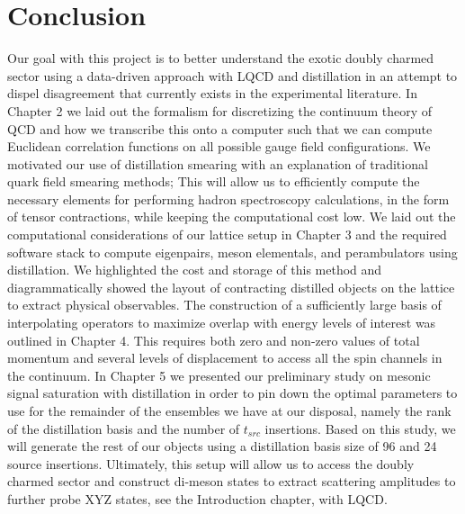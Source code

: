 \section{Conclusion}
Our goal with this project is to better understand the exotic doubly charmed sector using a data-driven approach with LQCD and distillation in an attempt to dispel disagreement that currently exists in the experimental literature. In Chapter 2 we laid out the formalism for discretizing the continuum theory of QCD and how we transcribe this onto a computer such that we can compute Euclidean correlation functions on all possible gauge field configurations. We motivated our use of distillation smearing with an explanation of traditional quark field smearing methods; This will allow us to efficiently compute the necessary elements for performing hadron spectroscopy calculations, in the form of tensor contractions, while keeping the computational cost low. We laid out the computational considerations of our lattice setup in Chapter 3 and the required software stack to compute eigenpairs, meson elementals, and perambulators using distillation. We highlighted the cost and storage of this method and diagrammatically showed the layout of contracting distilled objects on the lattice to extract physical observables. The construction of a sufficiently large basis of interpolating operators to maximize overlap with energy levels of interest was outlined in Chapter 4. This requires both zero and non-zero values of total momentum and several levels of displacement to access all the spin channels in the continuum. In Chapter 5 we presented our preliminary study on mesonic signal saturation with distillation in order to pin down the optimal parameters to use for the remainder of the ensembles we have at our disposal, namely the rank of the distillation basis and the number of $t_{src}$ insertions. Based on this study, we will generate the rest of our objects using a distillation basis size of 96 and 24 source insertions. Ultimately, this setup will allow us to access the doubly charmed sector and construct di-meson states to extract scattering amplitudes to further probe XYZ states, see the Introduction chapter, with LQCD.  




